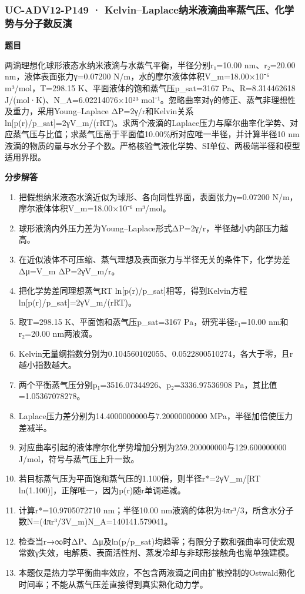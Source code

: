 \documentclass[UTF8,11pt,a4paper]{ctexart}
\begin{document}
\subsubsection*{UC-ADV12-P149 · Kelvin–Laplace纳米液滴曲率蒸气压、化学势与分子数反演}
\noindent\textbf{题目}\par
两滴理想化球形液态水纳米液滴与水蒸气平衡，半径分别r₁=10.00 nm、r₂=20.00 nm，液体表面张力γ=0.07200 N/m，水的摩尔液体体积V\_m=18.00×10⁻⁶ m³/mol，T=298.15 K、平面液体的饱和蒸气压p\_sat=3167 Pa、R=8.314462618 J/(mol·K)、N\_A=6.02214076×10²³ mol⁻¹。忽略曲率对γ的修正、蒸气非理想性及重力，采用Young–Laplace ΔP=2γ/r和Kelvin关系ln[p(r)/p\_sat]=2γV\_m/(rRT)。求两个液滴的Laplace压力与摩尔曲率化学势、对应蒸气压与比值；求蒸气压高于平面值10.00\%所对应唯一半径，并计算半径10 nm液滴的物质的量与水分子个数。严格核验气液化学势、SI单位、两极端半径和模型适用界限。\par
\medskip\noindent\textbf{分步解答}
\begin{enumerate}
\item 把假想纳米液态水滴近似为球形、各向同性界面，表面张力γ=0.07200 N/m，摩尔液体体积V\_m=18.00×10⁻⁶ m³/mol。
\item 球形液滴内外压力差为Young–Laplace形式ΔP=2γ/r，半径越小内部压力越高。
\item 在近似液体不可压缩、蒸气理想及表面张力与半径无关的条件下，化学势差Δμ=V\_m ΔP=2γV\_m/r。
\item 把化学势差同理想蒸气RT ln[p(r)/p\_sat]相等，得到Kelvin方程ln[p(r)/p\_sat]=2γV\_m/(rRT)。
\item 取T=298.15 K、平面饱和蒸气压p\_sat=3167 Pa，研究半径r₁=10.00 nm和r₂=20.00 nm两液滴。
\item Kelvin无量纲指数分别为0.104560102055、0.0522800510274，各大于零，且r越小指数越大。
\item 两个平衡蒸气压分别p₁=3516.07344926、p₂=3336.97536908 Pa，其比值=1.05367078278。
\item Laplace压力差分别为14.4000000000与7.20000000000 MPa，半径加倍使压力差减半。
\item 对应曲率引起的液体摩尔化学势增加分别为259.200000000与129.600000000 J/mol，符号与蒸气压上升一致。
\item 若目标蒸气压为平面饱和蒸气压的1.100倍，则半径r*=2γV\_m/[RT ln(1.100)]，正解唯一，因为p(r)随r单调递减。
\item 计算r*=10.9705072710 nm；半径10.00 nm液滴的体积为4πr³/3，所含水分子数N=(4πr³/3V\_m)N\_A=140141.579041。
\item 检查当r→∞时ΔP、Δμ及ln(p/p\_sat)均趋零；有限分子数和强曲率可使宏观常数γ失效，电解质、表面活性剂、蒸发冷却与非球形接触角也需单独建模。
\item 本题仅是热力学平衡曲率效应，不包含两液滴之间由扩散控制的Ostwald熟化时间率；不能从蒸气压差直接得到真实熟化动力学。
\end{enumerate}
\end{document}
